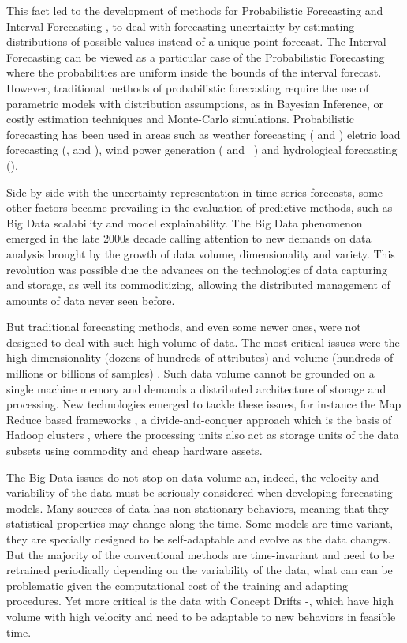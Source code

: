 This fact led to the development of methods for Probabilistic Forecasting \cite{Gneiting2014b} and  Interval Forecasting \cite{Chatfield1993},  to deal with forecasting uncertainty by estimating distributions of possible values instead of a unique point forecast. The Interval Forecasting can be viewed as a particular case of the Probabilistic Forecasting where the probabilities are uniform inside the bounds of the interval forecast. However, traditional methods of probabilistic forecasting require the use of parametric models with distribution assumptions, as in Bayesian Inference, or costly estimation techniques and Monte-Carlo simulations. Probabilistic forecasting has been used in areas such as weather forecasting (\cite{Fraley2011} and \cite{Leutbecher2008}) eletric load forecasting (\cite{Hong2016}, \cite{Hong2016a} and \cite{Liu2015}), wind power generation (\cite{Pinson2006} and  \cite{Netto2016}) and hydrological forecasting (\cite{Laio2007}).

Side by side with the uncertainty representation in time series forecasts, some other factors became prevailing in the evaluation of predictive methods, such as Big Data scalability and model explainability. The Big Data phenomenon emerged in the late 2000s decade \cite{Lynch2008} calling attention to new demands on data analysis brought by the growth of data volume, dimensionality and variety. This revolution was possible due the advances on the technologies of data capturing and storage, as well its commoditizing, allowing the distributed management of amounts of data never seen before. 

But traditional forecasting methods, and even some newer ones, were not designed to deal with such high volume of data. The most critical issues were the high dimensionality  (dozens of hundreds of attributes) and volume (hundreds of millions or billions of samples) \cite{Qiu2016}. Such data volume cannot be grounded on a single machine memory and demands a distributed architecture of storage and processing. New technologies emerged to tackle these issues, for instance the Map Reduce based frameworks \cite{Dean2008}, a divide-and-conquer approach which is the basis of Hadoop clusters \cite{White2012}, where the processing units also act as storage units of the data subsets using commodity and cheap hardware assets.

The Big Data issues do not stop on data volume an, indeed, the velocity and variability of the data must be seriously considered when developing forecasting models. Many sources of data has non-stationary behaviors, meaning that they statistical properties may change along the time. Some models are time-variant, they are specially designed to be self-adaptable and evolve as the data changes. But the majority of the  conventional methods are time-invariant and need to be retrained periodically depending on the variability of the data, what can can be problematic given the computational cost of the training and adapting procedures. Yet more critical is the data with Concept Drifts \cite{} -, which have high volume with high velocity and need to be adaptable to new behaviors in feasible time. 

